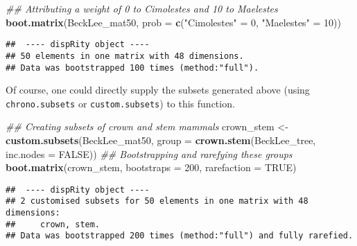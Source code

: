 \documentclass[
]{book}
\newenvironment{Shaded}{\begin{snugshade}}{\end{snugshade}}
\newcommand{\CommentTok}[1]{\textcolor[rgb]{0.56,0.35,0.01}{\textit{#1}}}
\newcommand{\DataTypeTok}[1]{\textcolor[rgb]{0.13,0.29,0.53}{#1}}
\newcommand{\DecValTok}[1]{\textcolor[rgb]{0.00,0.00,0.81}{#1}}
\newcommand{\KeywordTok}[1]{\textcolor[rgb]{0.13,0.29,0.53}{\textbf{#1}}}
\newcommand{\NormalTok}[1]{#1}
\newcommand{\OtherTok}[1]{\textcolor[rgb]{0.56,0.35,0.01}{#1}}
\newcommand{\StringTok}[1]{\textcolor[rgb]{0.31,0.60,0.02}{#1}}
\begin{document}
\begin{Shaded}
\begin{Highlighting}[]
\CommentTok{\#\# Attributing a weight of 0 to Cimolestes and 10 to Maelestes}
\KeywordTok{boot.matrix}\NormalTok{(BeckLee\_mat50,}
            \DataTypeTok{prob =} \KeywordTok{c}\NormalTok{(}\StringTok{"Cimolestes"}\NormalTok{ =}\StringTok{ }\DecValTok{0}\NormalTok{, }\StringTok{"Maelestes"}\NormalTok{ =}\StringTok{ }\DecValTok{10}\NormalTok{))}
\end{Highlighting}
\end{Shaded}

\begin{verbatim}
##  ---- dispRity object ---- 
## 50 elements in one matrix with 48 dimensions.
## Data was bootstrapped 100 times (method:"full").
\end{verbatim}

Of course, one could directly supply the subsets generated above (using \texttt{chrono.subsets} or \texttt{custom.subsets}) to this function.

\begin{Shaded}
\begin{Highlighting}[]
\CommentTok{\#\# Creating subsets of crown and stem mammals}
\NormalTok{crown\_stem \textless{}{-}}\StringTok{ }\KeywordTok{custom.subsets}\NormalTok{(BeckLee\_mat50,}
                             \DataTypeTok{group =} \KeywordTok{crown.stem}\NormalTok{(BeckLee\_tree,}
                                                \DataTypeTok{inc.nodes =} \OtherTok{FALSE}\NormalTok{))}
\CommentTok{\#\# Bootstrapping and rarefying these groups}
\KeywordTok{boot.matrix}\NormalTok{(crown\_stem, }\DataTypeTok{bootstraps =} \DecValTok{200}\NormalTok{, }\DataTypeTok{rarefaction =} \OtherTok{TRUE}\NormalTok{)}
\end{Highlighting}
\end{Shaded}

\begin{verbatim}
##  ---- dispRity object ---- 
## 2 customised subsets for 50 elements in one matrix with 48 dimensions:
##     crown, stem.
## Data was bootstrapped 200 times (method:"full") and fully rarefied.
\end{verbatim}
\end{document}
